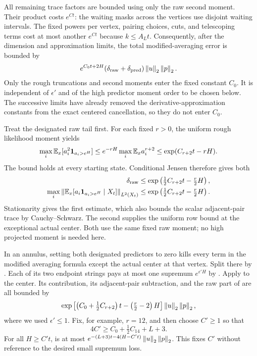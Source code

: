 All remaining trace factors are bounded using only the raw second
moment. Their product costs $e^{Ct}$: the waiting masks across the
vertices use disjoint waiting intervals. The fixed powers per
vertex, pairing choices, cuts, and telescoping terms cost at most
another $e^{Ct}$ because $k\leq A_Lt$. Consequently, after the
dimension and approximation limits, the total modified-averaging
error is bounded by
\begin{equation}\label{eq:hidden-cap-error}
 e^{C_0t+2H}
       (\delta_{\rm raw}+\delta_{\rm pred})
       \left\lVert u\right\rVert_2\left\lVert p\right\rVert_2.
\end{equation}
Only the rough truncations and second moments enter the fixed
constant $C_0$. It is independent of $\epsilon'$ and of the high
predictor moment order to be chosen below. The successive limits
have already removed the derivative-approximation constants from
the exact centered cancellation, so they do not enter $C_0$.

Treat the designated raw tail first. For each fixed $r>0$, the
uniform rough likelihood moment yields
\begin{equation}\label{eq:hidden-raw-tail}
 \max_i\mathbb E_x[a_i^2\mathbf 1_{a_i>e^H}]
 \leq e^{-rH}\max_i\mathbb E_x a_i^{r+2}
 \leq\exp(C_{r+2}t-rH).
\end{equation}
The bound holds at every starting state. Conditional Jensen therefore
gives both
\begin{align}
 \delta_{\rm raw}
 &\leq\exp\left(\tfrac12C_{r+2}t-\tfrac r2H\right),\notag\\
 \max_i\left\lVert \mathbb E_x[a_i\mathbf 1_{a_i>e^H}\mid X_t]\right\rVert_{L^2(X_t)}
 &\leq\exp\left(\tfrac12C_{r+2}t-\tfrac r2H\right).
 \label{eq:hidden-exceptional-center}
\end{align}
Stationarity gives the first estimate, which also bounds the scalar
adjacent-pair trace by Cauchy--Schwarz. The second supplies the
uniform row bound at the exceptional actual center. Both use the
same fixed raw moment; no high projected moment is needed here.

In an annulus, setting both designated predictors to zero kills every
term in the modified averaging formula except the actual center at
that vertex. Split there by . Each of its
two endpoint strings pays at most one supremum
$e^{\epsilon'H}$ by . Apply
 to the
center. Its contribution, its adjacent-pair subtraction, and the raw
part of  are all bounded by
\begin{equation}\label{eq:hidden-raw-annulus-cost}
 \exp\left[\left(C_0+\tfrac12C_{r+2}\right)t
                      -\left(\tfrac r2-2\right)H\right]
       \left\lVert u\right\rVert_2\left\lVert p\right\rVert_2,
\end{equation}
where we used $\epsilon'\leq1$. Fix, for example, $r=12$, and then
choose $C'\geq1$ so that
\begin{equation}\label{eq:hidden-raw-cap-choice}
 4C'\geq C_0+\tfrac12C_{14}+L+3.
\end{equation}
For all $H\geq C't$,  is at most
$e^{-(L+3)t-4(H-C't)}\left\lVert u\right\rVert_2\left\lVert p\right\rVert_2$. This fixes $C'$ without
reference to the desired small supremum loss.

